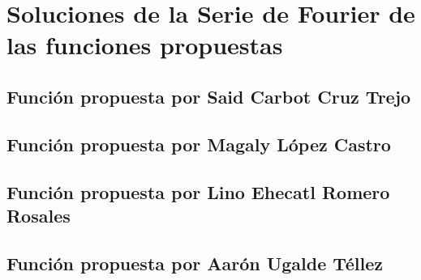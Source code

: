 \section{Soluciones de la Serie de Fourier de las funciones propuestas}
\label{sec:cap01:soluciones}


\subsection{Función propuesta por Said Carbot Cruz Trejo}
\label{sec:cap01:soluciones:said}



\subsection{Función propuesta por Magaly López Castro}
\label{sec:cap01:soluciones:magaly}



\subsection{Función propuesta por Lino Ehecatl Romero Rosales}
\label{sec:cap01:soluciones:lino}



\subsection{Función propuesta por Aarón Ugalde Téllez}
\label{sec:cap01:soluciones:aaron}




